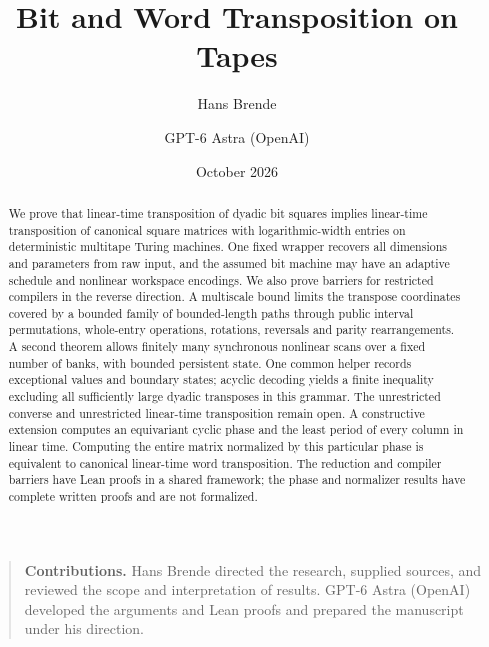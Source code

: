 \documentclass[11pt]{article}
\title{Bit and Word Transposition on Tapes}
\author{Hans Brende \and GPT-6 Astra (OpenAI)}
\date{October 2026}
\begin{document}
\maketitle
\begin{abstract}
We prove that linear-time transposition of dyadic bit squares implies
linear-time transposition of canonical square matrices with logarithmic-width
entries on deterministic multitape Turing machines. One fixed wrapper
recovers all dimensions and parameters from raw input, and the assumed bit
machine may have an adaptive schedule and nonlinear workspace encodings.
We also prove barriers for restricted compilers in the reverse direction.
A multiscale bound limits the transpose coordinates covered by a bounded
family of bounded-length paths through public interval permutations,
whole-entry operations, rotations, reversals and parity rearrangements.
A second theorem allows finitely many synchronous nonlinear scans over a
fixed number of banks, with bounded persistent state. One common helper
records exceptional values and boundary states; acyclic decoding yields
a finite inequality excluding all sufficiently large dyadic transposes in
this grammar. The unrestricted converse and unrestricted linear-time
transposition remain open. A constructive extension computes an equivariant
cyclic phase and the least period of every column in linear time. Computing
the entire matrix normalized by this particular phase is equivalent to
canonical linear-time word transposition. The reduction and compiler barriers
have Lean proofs in a shared framework; the phase and normalizer results
have complete written proofs and are not formalized.
\end{abstract}
\begin{quote}\small
\textbf{Contributions.} Hans Brende directed the research, supplied sources,
and reviewed the scope and interpretation of results. GPT-6 Astra (OpenAI)
developed the arguments and Lean proofs and prepared the manuscript under his
direction.
\end{quote}
\setcounter{tocdepth}{1}
\tableofcontents
\clearpage







\appendix

\clearpage
\begingroup\small\raggedright


\endgroup
\end{document}
